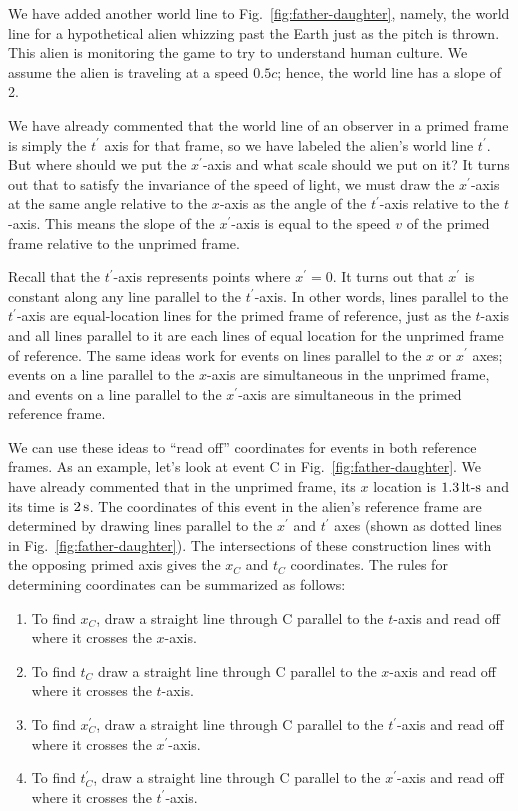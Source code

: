 We have added another world line to Fig.~\ref{fig:father-daughter},
namely, the world line for a hypothetical alien whizzing past the
Earth just as the pitch is thrown.  This alien is monitoring the game
to try to understand human culture.  We assume the alien is traveling
at a speed $0.5c$; hence, the world line has a slope of 2.

We have already commented that the world line of an observer in a
primed frame is simply the $t^\prime$ axis for that frame, so we have
labeled the alien's world line $t^\prime$. But where should we put the
$x^\prime$-axis and what scale should we put on it?  It turns out that to
satisfy the invariance of the speed of light, we must draw the
$x^\prime$-axis at the same angle relative to the $x$-axis as the angle of
the $t^\prime$-axis relative to the $t$-axis. This means the slope of the
$x^\prime$-axis is equal to the speed $v$ of the primed frame relative to the
unprimed frame.
    
Recall that the $t^\prime$-axis represents points where $x^\prime =
0$.  It turns out that $x^\prime$ is constant along any line parallel
to the $t^\prime$-axis.  In other words, lines parallel to the $t^\prime$-axis
are equal-location lines for the primed frame of reference, just as
the $t$-axis and all lines parallel to it are each lines of equal
location for the unprimed frame of reference.  The same ideas work for
events on lines parallel to the $x$ or $x^\prime$ axes; events on a line
parallel to the $x$-axis are simultaneous in the unprimed frame, and
events on a line parallel to the $x^\prime$-axis are simultaneous in the
primed reference frame.
    
We can use these ideas to ``read off'' coordinates for events in
both reference frames.  As an example, let's look at event C in
Fig.~\ref{fig:father-daughter}.  We have already commented that in the
unprimed frame, its $x$ location is $1.3\,\mbox{lt-s}$ and its time
is $2\,\mbox{s}$.  The coordinates of this event in the alien's
reference frame are determined by drawing lines parallel to the
$x^\prime$ and $t^\prime$ axes (shown as dotted lines in
Fig.~\ref{fig:father-daughter}).  The intersections of these
construction lines with the opposing primed axis gives the $x_C$ and
$t_C$ coordinates. The rules for determining coordinates can be
summarized as follows:
\begin{enumerate}
\item To find $x_C$, draw a straight line through C parallel to the
$t$-axis and read off where it crosses the $x$-axis.  
\item To find $t_C$ draw a straight line through C parallel to the
$x$-axis and read off where it crosses the $t$-axis.  
\item To find $x_C^\prime$, draw a straight line through C parallel to
the $t^\prime$-axis and read off where it crosses the $x^\prime$-axis.
\item To find $t_C^\prime$, draw a straight line through C parallel to the
$x^\prime$-axis and read off where it crosses the $t^\prime$-axis.
\end{enumerate}

